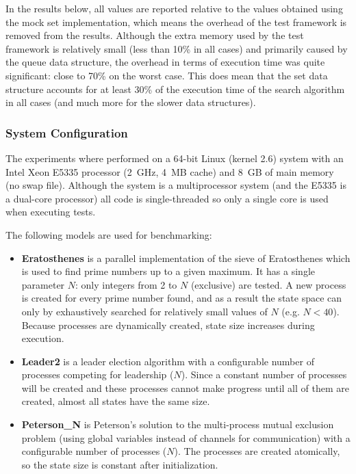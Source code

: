 \documentclass{acm_proc_article-sp}
\begin{document}
In the results below, all values are reported relative to the values obtained
using the mock set implementation, which means the overhead of the test
framework is removed from the results. Although the extra memory used by
the test framework is relatively small (less than 10\% in all cases) and
primarily caused by the queue data structure, the overhead in terms of
execution time was quite significant: close to 70\% on the worst case.
This does mean that the set data structure accounts for at least 30\%
of the execution time of the search algorithm in all cases (and much
more for the slower data structures).

\subsubsection{System Configuration}
The experiments where performed on a 64-bit Linux (kernel 2.6) system
with an Intel Xeon E5335 processor (2~GHz, 4~MB cache) and 8~GB of main
memory (no swap file). Although the system is a multiprocessor system
(and the E5335 is a dual-core processor) all code is single-threaded so
only a single core is used when executing tests.

The following models are used for benchmarking:
\begin{itemize}
\item\textbf{Eratosthenes} is a parallel implementation of the sieve
of Eratosthenes which is used to find prime numbers up to a given maximum.
It has a single parameter $N$: only integers from 2 to $N$ (exclusive) are
tested. A new process is created for every prime number found, and as a result
the state space can only by exhaustively searched for relatively small values
of $N$ (e.g. $N < 40$). Because processes are dynamically created, state size
increases during execution.

\item\textbf{Leader2} is a leader election algorithm with a configurable number
of processes competing for leadership ($N$). Since a constant number of
processes will be created and these processes cannot make progress until all
of them are created, almost all states have the same size.

\item\textbf{Peterson\_N} is Peterson's solution to the multi-process mutual
exclusion problem (using global variables instead of channels for
communication) with a configurable number of processes ($N$). The processes
are created atomically, so the state size is constant after initialization.
\end{itemize}
\end{document}
